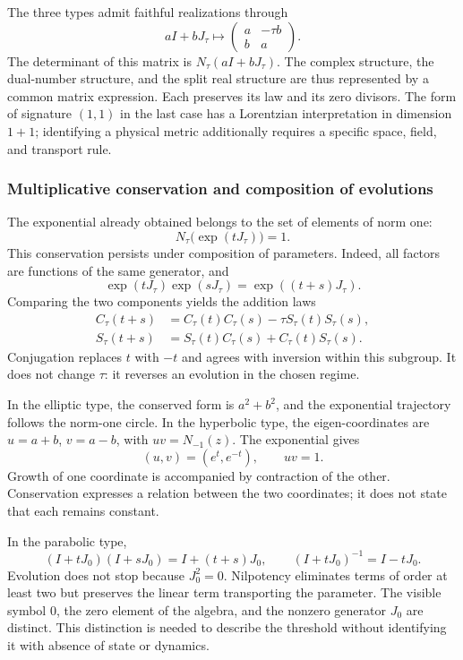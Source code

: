 The three types admit faithful realizations through
\[
 aI+bJ_\tau\longmapsto
 \begin{pmatrix}a&-\tau b\\b&a\end{pmatrix}.
\]
The determinant of this matrix is \(N_\tau(aI+bJ_\tau)\). The complex
structure, the dual-number structure, and the split real structure are
thus represented by a common matrix expression.
Each preserves its law and its zero divisors. The form of signature
\((1,1)\) in the last case has a Lorentzian interpretation in dimension
\(1+1\); identifying a physical metric additionally requires a specific space,
field, and transport rule.

\subsubsection{Multiplicative conservation and composition of evolutions}
\label{trit-ampl-evoluciones}

The exponential already obtained belongs to the set of elements of norm one:
\[
 N_\tau\bigl(\exp(tJ_\tau)\bigr)=1.
\]
This conservation persists under composition of parameters. Indeed, all
factors are functions of the same generator, and
\[
 \exp(tJ_\tau)\exp(sJ_\tau)=\exp((t+s)J_\tau).
\]
Comparing the two components yields the addition laws
\begin{align}
 C_\tau(t+s)&=C_\tau(t)C_\tau(s)-\tau S_\tau(t)S_\tau(s),\\
 S_\tau(t+s)&=S_\tau(t)C_\tau(s)+C_\tau(t)S_\tau(s).
\end{align}
Conjugation replaces \(t\) with \(-t\) and agrees with inversion within
this subgroup. It does not change \(\tau\): it reverses an evolution in the
chosen regime.

In the elliptic type, the conserved form is \(a^2+b^2\), and the exponential
trajectory follows the norm-one circle. In the hyperbolic type, the
eigen-coordinates are \(u=a+b\), \(v=a-b\), with \(uv=N_{-1}(z)\).
The exponential gives
\[
 (u,v)=(e^t,e^{-t}),\qquad uv=1.
\]
Growth of one coordinate is accompanied by contraction of the other.
Conservation expresses a relation between the two coordinates; it does not state that
each remains constant.

In the parabolic type,
\[
 (I+tJ_0)(I+sJ_0)=I+(t+s)J_0,\qquad
 (I+tJ_0)^{-1}=I-tJ_0.
\]
Evolution does not stop because \(J_0^2=0\). Nilpotency eliminates terms
of order at least two but preserves the linear term transporting the
parameter. The visible symbol \(0\), the zero element of the algebra,
and the nonzero generator \(J_0\) are distinct. This distinction
is needed to describe the threshold without identifying it with absence of
state or dynamics.


